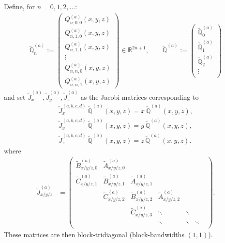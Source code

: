 \documentclass[11pt, oneside]{article}   	%
\newcommand{\R}{\mathbb{R}}
\newcommand{\scop}{Q}
\newcommand{\scopa}{\scop^{(a)}}
\newcommand{\bigscopt}{\mathbb{\tilde{Q}}}
\newcommand{\bigscopta}{\bigscopt^{(a)}}
\newcommand{\bigscoptna}{\bigscopta_{n}}
\begin{document}
Define, for $n=0,1,2,\dots$: 
\begin{align*}
	\bigscoptna := 
		\begin{pmatrix}
			\scopa_{n,0,0}(x,y,z) \\
			\scopa_{n,1,0}(x,y,z) \\
			\scopa_{n,1,1}(x,y,z) \\
			\vdots \\
			\scopa_{n,n,0}(x,y,z) \\
			\scopa_{n,n,1}(x,y,z)
		\end{pmatrix} \in \R^{2n+1}, 
	\quad \quad 
	\bigscopta := 
		\begin{pmatrix}
			\bigscopta_0 \\
			\bigscopta_1 \\
			\bigscopta_2 \\
			\vdots \\
		\end{pmatrix}
\end{align*}
and set $\tilde J_x^{(a)}, \tilde J_y^{(a)}, \tilde J_z^{(a)}$ as the Jacobi matrices corresponding to
\begin{align}
	\tilde J_x^{(a,b,c,d)} \: \bigscopta(x,y,z) = x \: \bigscopta(x,y,z), \nonumber \\
	\tilde J_y^{(a,b,c,d)} \: \bigscopta(x,y,z) = y \: \bigscopta(x,y,z), \label{eqn:jacobimatricesdefinitionalt} \\
	\tilde J_z^{(a,b,c,d)} \: \bigscopta(x,y,z) = z \: \bigscopta(x,y,z). \nonumber
\end{align}
where
\begin{align*}
	\tilde J_{x/y/z}^{(a)} &= 
		\begin{pmatrix}
			\tilde B^{(a)}_{x/y/z, 0} & \tilde A^{(a)}_{x/y/z, 0} & & & & \\
			\tilde C^{(a)}_{x/y/z, 1} & \tilde B^{(a)}_{x/y/z, 1} & \tilde A^{(a)}_{x/y/z, 1} & & & \\
			& \tilde C^{(a)}_{x/y/z, 2} & \tilde B^{(a)}_{x/y/z, 2} & \tilde A^{(a)}_{x/y/z, 2} & & & \\
			& & \tilde C^{(a)}_{x/y/z, 3} & \ddots & \ddots & \\
			& & & \ddots & \ddots & \ddots \\
		\end{pmatrix}.
\end{align*}
These matrices are then block-tridiagonal (block-bandwidths $(1,1)$).
\end{document}
